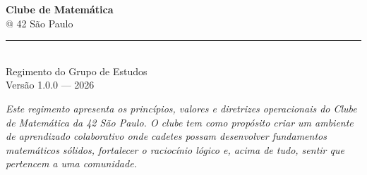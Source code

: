 \documentclass[12pt, a4paper]{article}
\begin{document}
\thispagestyle{empty}

\begin{center}
  \vspace*{1.5cm}
  \logoClube
  \vspace*{1cm}
  {\fontsize{32}{36}\selectfont\color{azul42}\textbf{Clube de Matemática}}\\[0.3cm]
  {\fontsize{20}{24}\selectfont\color{cinza}@ 42 São Paulo}\\[1.2cm]
  {\color{azul42}\rule{0.6\textwidth}{1.5pt}}\\[0.8cm]
  {\large\color{cinza}Regimento do Grupo de Estudos}\\[0.4cm]
  {\normalsize\color{cinza}Versão 1.0.0 --- 2026}\\[1.5cm]
  \begin{minipage}{0.75\textwidth}
    \centering\itshape\color{cinza}\small
    Este regimento apresenta os princípios, valores e diretrizes operacionais do
    Clube de Matemática da 42 São Paulo. O clube tem como propósito criar um
    ambiente de aprendizado colaborativo onde cadetes possam desenvolver
    fundamentos matemáticos sólidos, fortalecer o raciocínio lógico e, acima
    de tudo, sentir que pertencem a uma comunidade.
  \end{minipage}
\end{center}

\clearpage
\tableofcontents
\clearpage








\appendix



\end{document}
